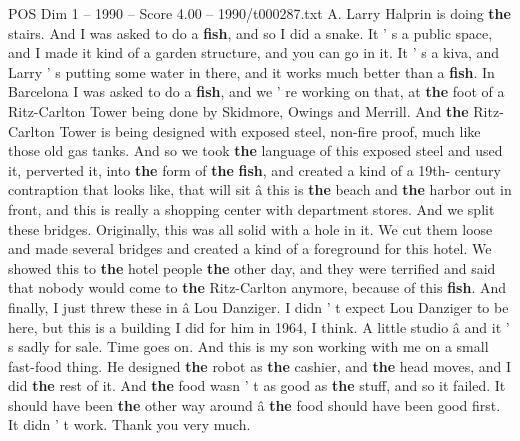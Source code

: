 \begin{textsample}{POS Dim 1 – 1990 – Score 4.00 – 1990/t000287.txt}
A.
Larry Halprin is doing \textbf{the} stairs.
And I was asked to do a \textbf{fish}, and so I did a snake.
It ' s a public space, and I made it kind of a garden structure, and you can go in it.
It ' s a kiva, and Larry ' s putting some water in there, and it works much better than a \textbf{fish}.
In Barcelona I was asked to do a \textbf{fish}, and we ' re working on that, at \textbf{the} foot of a Ritz-Carlton Tower being done by Skidmore, Owings and Merrill.
And \textbf{the} Ritz-Carlton Tower is being designed with exposed steel, non-fire proof, much like those old gas tanks.
And so we took \textbf{the} language of this exposed steel and used it, perverted it, into \textbf{the} form of \textbf{the} \textbf{fish}, and created a kind of a 19th- century contraption that looks like, that will sit â this is \textbf{the} beach and \textbf{the} harbor out in front, and this is really a shopping center with department stores.
And we split these bridges.
Originally, this was all solid with a hole in it.
We cut them loose and made several bridges and created a kind of a foreground for this hotel.
We showed this to \textbf{the} hotel people \textbf{the} other day, and they were terrified and said that nobody would come to \textbf{the} Ritz-Carlton anymore, because of this \textbf{fish}.
And finally, I just threw these in â Lou Danziger.
I didn ' t expect Lou Danziger to be here, but this is a building I did for him in 1964, I think.
A little studio â and it ' s sadly for sale.
Time goes on.
And this is my son working with me on a small fast-food thing.
He designed \textbf{the} robot as \textbf{the} cashier, and \textbf{the} head moves, and I did \textbf{the} rest of it.
And \textbf{the} food wasn ' t as good as \textbf{the} stuff, and so it failed.
It should have been \textbf{the} other way around â \textbf{the} food should have been good first.
It didn ' t work.
Thank you very much.

\end{textsample}
